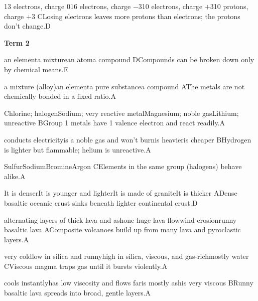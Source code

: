 \begin{gradebody}
{13 electrons, charge 0}{16 electrons, charge $-3$}{10 electrons, charge $+3$}{10 protons, charge $+3$}
{C}{Losing electrons leaves more protons than electrons; the protons don't change.}{D}

\textbf{Term 2}

{an element}{a mixture}{an atom}{a compound}
{D}{Compounds can be broken down only by chemical means.}{E}

{a mixture (alloy)}{an element}{a pure substance}{a compound}
{A}{The metals are not chemically bonded in a fixed ratio.}{A}

{Chlorine; halogen}{Sodium; very reactive metal}{Magnesium; noble gas}{Lithium; unreactive}
{B}{Group 1 metals have 1 valence electron and react readily.}{A}

{conducts electricity}{is a noble gas and won't burn}{is heavier}{is cheaper}
{B}{Hydrogen is lighter but flammable; helium is unreactive.}{A}

{Sulfur}{Sodium}{Bromine}{Argon}
{C}{Elements in the same group (halogens) behave alike.}{A}

{It is denser}{It is younger and lighter}{It is made of granite}{It is thicker}
{A}{Dense basaltic oceanic crust sinks beneath lighter continental crust.}{D}

{alternating layers of thick lava and ash}{one huge lava flow}{wind erosion}{runny basaltic lava}
{A}{Composite volcanoes build up from many lava and pyroclastic layers.}{A}

{very cold}{low in silica and runny}{high in silica, viscous, and gas-rich}{mostly water}
{C}{Viscous magma traps gas until it bursts violently.}{A}

{cools instantly}{has low viscosity and flows far}{is mostly ash}{is very viscous}
{B}{Runny basaltic lava spreads into broad, gentle layers.}{A}


\end{gradebody}
